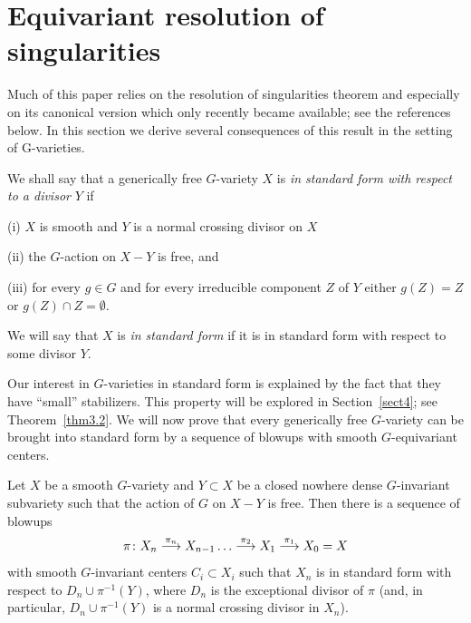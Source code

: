 \section{Equivariant resolution of singularities}
\label{sect3}

Much of this paper relies on the resolution
of singularities theorem and especially on its canonical version which 
only recently became available; see the references below.
In this section we
derive several consequences of this result in the setting of G-varieties.

\begin{defn} \label{def3.1}
We shall say that a generically free $G$-variety $X$ is {\em in standard form
with respect to a divisor} $Y$ if

\smallskip
(i) $X$ is smooth and $Y$ is a normal crossing divisor on $X$

\smallskip
(ii) the $G$-action on $X - Y$ is free, and 

\smallskip
(iii) for every $g \in G$ and for every irreducible component $Z$ of $Y$
either $g(Z) = Z$ or $g(Z) \cap Z = \emptyset$.

\smallskip
We will say that $X$ is {\em in standard form} if it is in standard form
with respect to some divisor $Y$.
\end{defn}

Our interest in $G$-varieties in standard form is explained by the fact
that they have ``small'' stabilizers. This property will be explored 
in Section~\ref{sect4}; see Theorem~\ref{thm3.2}. We will now prove that
every generically free $G$-variety can be brought into standard form
by a sequence of blowups with smooth $G$-equivariant centers.

\begin{thm} \label{thm.b1-2}
Let $X$ be a smooth $G$-variety
and $Y\subset X$ be a closed nowhere dense $G$-invariant
subvariety such that the action of $G$ on $X-Y$ is free. Then
there is a sequence of blowups
\begin{equation} \label{tower1}
\pi\colon X_n \stackrel{\pi_n}{\longrightarrow} X_{n-1}
\dots \stackrel{\pi_2}{\longrightarrow} X_1 \stackrel{\pi_1}{\longrightarrow} X_0 = X 
\end{equation}
with smooth $G$-invariant centers $C_i\subset X_{i}$ such that 
$X_n$ is in standard form with respect to $D_n\cup\pi^{-1}(Y)$, where $D_n$ is
the exceptional divisor of $\pi$ (and, in particular,
$D_n\cup\pi^{-1}(Y)$ is a normal crossing divisor in $X_n$).
\end{thm}

